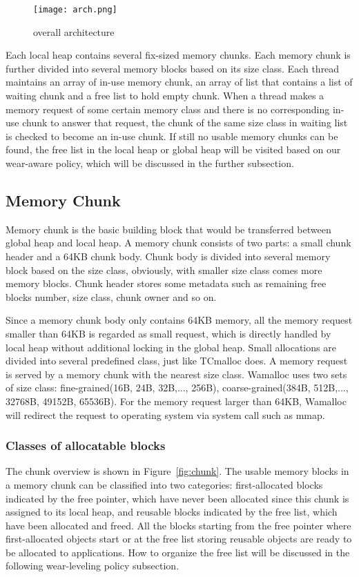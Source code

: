 \documentclass{vldb}
\begin{document}
\begin{figure}
\centering
\texttt{[image: arch.png]}
\caption{overall architecture}
\label{fig:arch}
\end{figure}

Each local heap contains several fix-sized memory chunks.
Each memory chunk is further divided into several memory blocks based on its size class.
Each thread maintains an array of in-use memory chunk, an array of list that contains a list of waiting chunk and a free list to hold empty chunk.
When a thread makes a memory request of some certain memory class and there is no corresponding in-use chunk to answer that request,
the chunk of the same size class in waiting list is checked to become an in-use chunk. 
If still no usable memory chunks can be found,
the free list in the local heap or global heap will be visited based on our wear-aware policy,
which will be discussed in the further subsection.

\subsection{Memory Chunk}

Memory chunk is the basic building block that would be transferred between global heap and local heap. 
A memory chunk consists of two parts: a small chunk header and a 64KB chunk body. 
Chunk body is divided into several memory block based on the size class,
obviously, with smaller size class comes more memory blocks. 
Chunk header stores some metadata such as remaining free blocks number, size class, chunk owner and so on.

Since a memory chunk body only contains 64KB memory, all the memory request smaller than 64KB is regarded as small request,
which is directly handled by local heap without additional locking in the global heap.
Small allocations are divided into several predefined class, just like TCmalloc does. 
A memory request is served by a memory chunk with the nearest size class. 
Wamalloc uses two sets of size class: fine-grained(16B, 24B, 32B,..., 256B), coarse-grained(384B, 512B,..., 32768B, 49152B, 65536B). 
For the memory request larger than 64KB, Wamalloc will redirect the request to operating system via system call such as mmap.

\subsubsection{Classes of allocatable blocks}
The chunk overview is shown in Figure~\ref{fig:chunk}.
The usable memory blocks in a memory chunk can be classified into two categories:
first-allocated blocks indicated by the free pointer, which have never been allocated since this chunk is assigned to its local heap,
and reusable blocks indicated by the free list, which have been allocated and freed.
All the blocks starting from the free pointer where first-allocated objects start or at the free list storing reusable objects are ready to be allocated to applications. 
How to organize the free list will be discussed in the following wear-leveling policy subsection.
\end{document}
